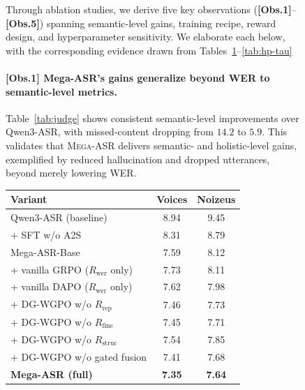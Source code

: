 \documentclass{article}
\begin{document}
\begin{figure}[!h]
\begin{minipage}[c]{0.46\textwidth}
Through ablation studies, we derive five key observations (\textbf{[Obs.1]}--\textbf{[Obs.5]}) spanning semantic-level gains, training recipe, reward design, and hyperparameter sensitivity. We elaborate each below, with the corresponding evidence drawn from Tables~\ref{tab:ablation}--\ref{tab:hp-tau} \paragraph{\textbf{[Obs.1] Mega-ASR's gains generalize beyond WER to semantic-level metrics.}}
Table~\ref{tab:judge} shows consistent semantic-level improvements over Qwen3-ASR, with missed-content dropping from $14.2$ to $5.9$. This validates that \textsc{Mega-ASR} delivers semantic- and holistic-level gains, exemplified by reduced hallucination and dropped utterances, beyond merely lowering WER.
\end{minipage}%
\hfill
\begin{minipage}[c]{0.52\textwidth}
\centering
{}
\label{tab:ablation}
\small
\begin{tabular}{lcc}
\toprule
\textbf{Variant} & \textbf{Voices} & \textbf{Noizeus} \\
\midrule
Qwen3-ASR (baseline)            & 8.94 & 9.45 \\
\midrule
+ SFT w/o A2S     & 8.31 & 8.79 \\
Mega-ASR-Base    &  7.59 & 8.12 \\
\midrule
+ vanilla GRPO ($R_\text{wer}$ only) & 7.73 & 8.11 \\
+ vanilla DAPO ($R_\text{wer}$ only) & 7.62 & 7.98 \\
+ DG-WGPO w/o $R_\text{rep}$    & 7.46 & 7.73 \\
+ DG-WGPO w/o $R_\text{fine}$   & 7.45 & 7.71 \\
+ DG-WGPO w/o $R_\text{struc}$  & 7.54 & 7.85 \\
+ DG-WGPO w/o gated fusion      & 7.41 & 7.68 \\
\midrule
\textbf{Mega-ASR (full)}        & \textbf{7.35} & \textbf{7.64} \\
\bottomrule
\end{tabular}
\end{minipage}
\end{figure}
\end{document}
